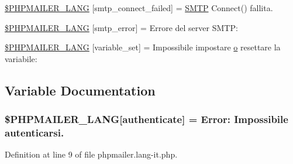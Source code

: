 \begin{DoxyCompactItemize}
\item 
\hyperlink{phpmailer_8lang-it_8php_a7b321d4ca1e9df702403ed4c61aa0980}{\$\+P\+H\+P\+M\+A\+I\+L\+E\+R\+\_\+\+L\+A\+NG} \mbox{[}\textquotesingle{}smtp\+\_\+connect\+\_\+failed\textquotesingle{}\mbox{]} = \textquotesingle{}\hyperlink{class_s_m_t_p}{S\+M\+TP} Connect() fallita.\textquotesingle{}
\item 
\hyperlink{phpmailer_8lang-it_8php_a7d9cffba1e669c845f8a4c891ee50064}{\$\+P\+H\+P\+M\+A\+I\+L\+E\+R\+\_\+\+L\+A\+NG} \mbox{[}\textquotesingle{}smtp\+\_\+error\textquotesingle{}\mbox{]} = \textquotesingle{}Errore del server S\+M\+T\+P\+: \textquotesingle{}
\item 
\hyperlink{phpmailer_8lang-it_8php_af795debc7a739d038742691c358d9032}{\$\+P\+H\+P\+M\+A\+I\+L\+E\+R\+\_\+\+L\+A\+NG} \mbox{[}\textquotesingle{}variable\+\_\+set\textquotesingle{}\mbox{]} = \textquotesingle{}Impossibile impostare \hyperlink{fullpage_2plugin_8min_8js_a4afc7c854f61c136d7bcfa8997651b88}{o} resettare la variabile\+: \textquotesingle{}
\end{DoxyCompactItemize}


\subsection{Variable Documentation}
\subsubsection[{\texorpdfstring{\$\+P\+H\+P\+M\+A\+I\+L\+E\+R\+\_\+\+L\+A\+NG}{$PHPMAILER_LANG}}]{\setlength{\rightskip}{0pt plus 5cm}\$P\+H\+P\+M\+A\+I\+L\+E\+R\+\_\+\+L\+A\+NG\mbox{[}\textquotesingle{}authenticate\textquotesingle{}\mbox{]} =  Error\+: Impossibile autenticarsi.\textquotesingle{}}\hypertarget{phpmailer_8lang-it_8php_a2cb33073c989b85580748e331ed8b4aa}{}\label{phpmailer_8lang-it_8php_a2cb33073c989b85580748e331ed8b4aa}


Definition at line 9 of file phpmailer.\+lang-\/it.\+php.

